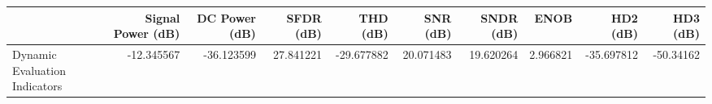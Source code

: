 \begin{tabular}{lrrrrrrrrr}
\toprule
{} &  Signal Power (dB) &  DC Power (dB) &  SFDR (dB) &   THD (dB) &   SNR (dB) &  SNDR (dB) &      ENOB &   HD2 (dB) &  HD3 (dB) \\
\midrule
Dynamic Evaluation Indicators &         -12.345567 &     -36.123599 &  27.841221 & -29.677882 &  20.071483 &  19.620264 &  2.966821 & -35.697812 & -50.34162 \\
\bottomrule
\end{tabular}

